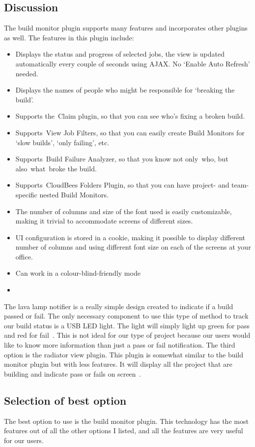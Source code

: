 \documentclass[10pt,letterpaper,onecolumn,journal]{IEEEtran}
\begin{document}
\subsection{Discussion}
The build monitor plugin supports many features and incorporates other plugins as well.
The features in this plugin include:
\begin{itemize}
  \item Displays the status and progress of selected jobs, the view is updated automatically every couple of seconds using AJAX\@. No `Enable Auto Refresh' needed.
  \item Displays the names of people who might be responsible for `breaking the build'.
  \item Supports the Claim plugin, so that you can see who's fixing a broken build.
  \item Supports View Job Filters, so that you can easily create Build Monitors for `slow builds', `only failing', etc.
  \item Supports Build Failure Analyzer, so that you know not only who, but also what broke the build.
  \item Supports CloudBees Folders Plugin, so that you can have project- and team-specific nested Build Monitors.
  \item The number of columns and size of the font used is easily customizable, making it trivial to accommodate screens of different sizes.
  \item UI configuration is stored in a cookie, making it possible to display different number of columns and using different font size on each of the screens at your office.
  \item Can work in a colour-blind-friendly mode
  \item~\cite{buildmonitor}
\end{itemize}
The lava lamp notifier is a really simple design created to indicate if a build passed or fail.
The only necessary component to use this type of method to track our build status is a USB LED light.
The light will simply light up green for pass and red for fail~\cite{lavalamp}.
This is not ideal for our type of project because our users would like to know more information than just a pass or fail notification.
The third option is the radiator view plugin.
This plugin is somewhat similar to the build monitor plugin but with less features.
It will display all the project that are building and indicate pass or fails on screen~\cite{radiatorview}.
\subsection{Selection of best option}
The best option to use is the build monitor plugin.
This technology has the most features out of all the other options I listed, and all the features are very useful for our users.



\end{document}
